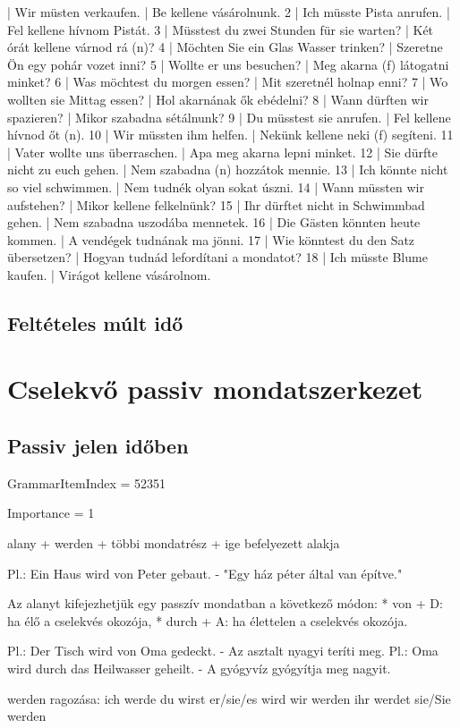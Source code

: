 \documentclass{article}
\newenvironment{desc}{\verbatim}{\endverbatim}
\newenvironment{exmp}{\verbatim}{\endverbatim}
\begin{document}
\begin{exmp}
1 | Wir müsten verkaufen. | Be kellene vásárolnunk.
2 | Ich müsste Pista anrufen. | Fel kellene hívnom Pistát.
3 | Müsstest du zwei Stunden für sie warten? | Két órát kellene várnod rá (n)?
4 | Möchten Sie ein Glas Wasser trinken? | Szeretne Ön egy pohár vozet inni?
5 | Wollte er uns besuchen? | Meg akarna (f) látogatni minket?
6 | Was möchtest du morgen essen? | Mit szeretnél holnap enni?
7 | Wo wollten sie Mittag essen? | Hol akarnának ők ebédelni?
8 | Wann dürften wir spazieren? | Mikor szabadna sétálnunk?
9 | Du müsstest sie anrufen. | Fel kellene hívnod őt (n).
10 | Wir müssten ihm helfen. | Nekünk kellene neki (f) segíteni.
11 | Vater wollte uns überraschen. | Apa meg akarna lepni minket.
12 | Sie dürfte nicht zu euch gehen. | Nem szabadna (n) hozzátok mennie.
13 | Ich könnte nicht so viel schwimmen. | Nem tudnék olyan sokat úszni.
14 | Wann müssten wir aufstehen? | Mikor kellene felkelnünk?
15 | Ihr dürftet nicht in Schwimmbad gehen. | Nem szabadna uszodába mennetek.
16 | Die Gästen könnten heute kommen. | A vendégek tudnának ma jönni.
17 | Wie könntest du den Satz übersetzen? | Hogyan tudnád lefordítani a mondatot?
18 | Ich müsste Blume kaufen. | Virágot kellene vásárolnom.
\end{exmp}

\subsection{Feltételes múlt idő}

\section{Cselekvő passiv mondatszerkezet}

\subsection{Passiv jelen időben}

GrammarItemIndex = 52351

Importance = 1

\begin{desc}
alany + werden + többi mondatrész + ige befelyezett alakja

Pl.: Ein Haus wird von Peter gebaut. - "Egy ház péter által van építve."

Az alanyt kifejezhetjük egy passzív mondatban a következő módon:
* von + D: ha élő a cselekvés okozója,
* durch + A: ha élettelen a cselekvés okozója.

Pl.: Der Tisch wird von Oma gedeckt. - Az asztalt nyagyi teríti meg.
Pl.: Oma wird durch das Heilwasser geheilt. - A gyógyvíz gyógyítja meg nagyit.

werden ragozása:
ich werde
du wirst
er/sie/es wird
wir werden
ihr werdet
sie/Sie werden
\end{desc}
\end{document}
